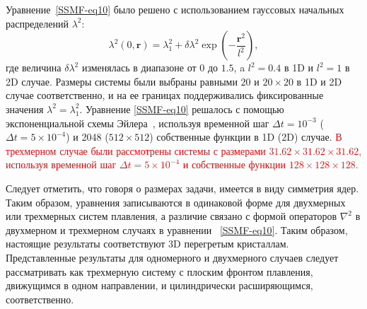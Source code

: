 Уравнение~\eqref{SSMF-eq10} было решено с использованием гауссовых начальных распределений $ \lambda ^ 2$:
\begin{equation}
\label{SSMF-eq11}
\lambda^2(0, \mathbf{r}) = \lambda^2_1 + \delta\lambda^2 \exp\left(-\frac{\mathbf{r}^2}{l^2}\right),
\end{equation}
где величина $ \delta\lambda^2$ изменялась в диапазоне от $ 0 $ до $ 1.5 $, a $ l ^ 2 = 0.4 $ в 1D и $ l ^ 2 = 1 $ в 2D случае.
Размеры системы были выбраны равными $20$ и $20 \times 20 $ в 1D и 2D случае соответственно, и на ее границах поддерживались фиксированные значения $\lambda^2= \lambda_1 ^ 2 $.
Уравнение \eqref{SSMF-eq10} решалось с помощью экспоненциальной схемы Эйлера~\cite{10.1098/rspa.2008.0325}, используя временной шаг $\Delta t=10^{-3}$ ($\Delta t=5\times10^{-4}$) и
2048 ($512\times512$) собственные функции в 1D (2D) случае. \textcolor{red}{В трехмерном случае были рассмотрены системы с размерами $31.62 \times 31.62 \times 31.62$, используя временной шаг $\Delta t = 5 \times 10 ^ {-4}$ и собственные функции $128 \times 128 \times 128 $.}

Следует отметить, что говоря о размерах задачи, имеется в виду симметрия ядер. Таким образом, уравнения записываются в одинаковой форме для двухмерных или трехмерных систем плавления, а различие связано с формой операторов $\nabla ^ 2$ в двухмерном и трехмерном случаях в уравнении ~\eqref{SSMF-eq10}. Таким образом, настоящие результаты соответствуют 3D перегретым кристаллам. Представленные результаты для одномерного и двухмерного случаев следует рассматривать как трехмерную систему с плоским фронтом плавления, движущимся в одном направлении, и цилиндрически расширяющимся, соответственно.

